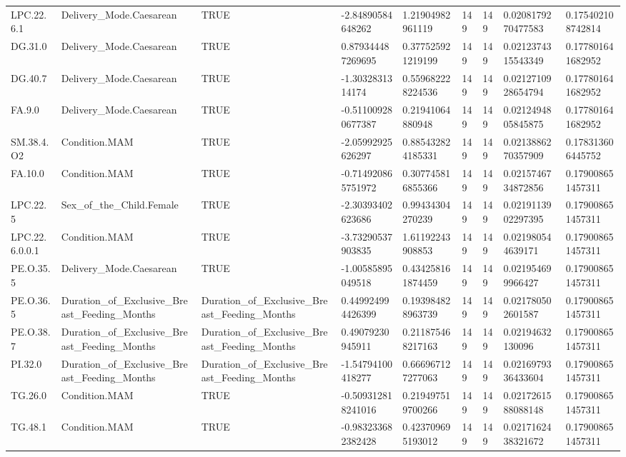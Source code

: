 \begin{longtable}{lllllllll}
LPC.22.6.1 & Delivery\_Mode.Caesarean & TRUE & -2.84890584648262 & 1.21904982961119 & 149 & 149 & 0.0208179270477583 & 0.175402108742814 \\
DG.31.0 & Delivery\_Mode.Caesarean & TRUE & 0.879344487269695 & 0.377525921219199 & 149 & 149 & 0.0212374315543349 & 0.177801641682952 \\
DG.40.7 & Delivery\_Mode.Caesarean & TRUE & -1.3032831314174 & 0.559682228224536 & 149 & 149 & 0.0212710928654794 & 0.177801641682952 \\
FA.9.0 & Delivery\_Mode.Caesarean & TRUE & -0.511009280677387 & 0.21941064880948 & 149 & 149 & 0.0212494805845875 & 0.177801641682952 \\
SM.38.4.O2 & Condition.MAM & TRUE & -2.05992925626297 & 0.885432824185331 & 149 & 149 & 0.0213886270357909 & 0.178313606445752 \\
FA.10.0 & Condition.MAM & TRUE & -0.714920865751972 & 0.307745816855366 & 149 & 149 & 0.0215746734872856 & 0.179008651457311 \\
LPC.22.5 & Sex\_of\_the\_Child.Female & TRUE & -2.30393402623686 & 0.99434304270239 & 149 & 149 & 0.0219113902297395 & 0.179008651457311 \\
LPC.22.6.0.0.1 & Condition.MAM & TRUE & -3.73290537903835 & 1.61192243908853 & 149 & 149 & 0.021980544639171 & 0.179008651457311 \\
PE.O.35.5 & Delivery\_Mode.Caesarean & TRUE & -1.00585895049518 & 0.434258161874459 & 149 & 149 & 0.021954699966427 & 0.179008651457311 \\
PE.O.36.5 & Duration\_of\_Exclusive\_Breast\_Feeding\_Months & Duration\_of\_Exclusive\_Breast\_Feeding\_Months & 0.449924994426399 & 0.193984828963739 & 149 & 149 & 0.021780502601587 & 0.179008651457311 \\
PE.O.38.7 & Duration\_of\_Exclusive\_Breast\_Feeding\_Months & Duration\_of\_Exclusive\_Breast\_Feeding\_Months & 0.49079230945911 & 0.211875468217163 & 149 & 149 & 0.02194632130096 & 0.179008651457311 \\
PI.32.0 & Duration\_of\_Exclusive\_Breast\_Feeding\_Months & Duration\_of\_Exclusive\_Breast\_Feeding\_Months & -1.54794100418277 & 0.666967127277063 & 149 & 149 & 0.0216979336433604 & 0.179008651457311 \\
TG.26.0 & Condition.MAM & TRUE & -0.509312818241016 & 0.219497519700266 & 149 & 149 & 0.0217261588088148 & 0.179008651457311 \\
TG.48.1 & Condition.MAM & TRUE & -0.983233682382428 & 0.423709695193012 & 149 & 149 & 0.0217162438321672 & 0.179008651457311 \\

\end{longtable}
